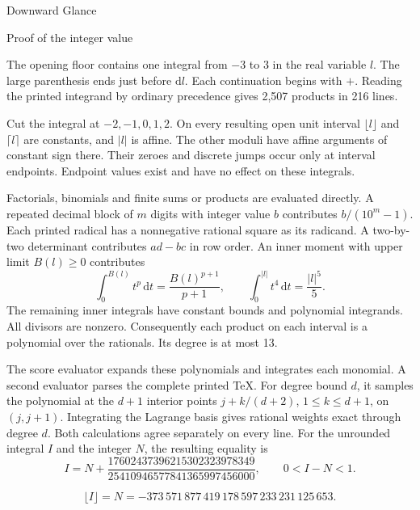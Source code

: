 \documentclass[10pt]{article}
\begin{document}
\fontsize{10.6}{14.0}\selectfont
{\fontsize{29}{32}\selectfont Downward Glance}\par
{\fontsize{15}{18}\selectfont Proof of the integer value}\par
\vspace{3pt}
The opening floor contains one integral from $-3$ to $3$ in the real variable $l$.
The large parenthesis ends just before $\mathrm{d}l$. Each continuation begins
with $+$. Reading the printed integrand by ordinary precedence gives 2,507
products in 216 lines.

\par
Cut the integral at $-2,-1,0,1,2$. On every resulting open unit interval
$\lfloor l\rfloor$ and $\lceil l\rceil$ are constants, and $|l|$ is affine.
The other moduli have affine arguments of constant sign there.
Their zeroes and discrete jumps occur only at interval endpoints.
Endpoint values exist and have no effect on these integrals.

Factorials, binomials and finite sums or products are evaluated directly.
A repeated decimal block of $m$ digits with integer value $b$ contributes
$b/(10^m-1)$. Each printed radical has a nonnegative rational square as its
radicand. A two-by-two determinant contributes $ad-bc$ in row order.
An inner moment with upper limit $B(l)\geq0$ contributes
\[
   \int_0^{B(l)} t^p\,\mathrm{d}t=\frac{B(l)^{p+1}}{p+1},\qquad \int_0^{|l|}t^4\,\mathrm{d}t=\frac{|l|^5}{5}.
\]
The remaining inner integrals have constant bounds and polynomial integrands.
All divisors are nonzero. Consequently each product on each interval is a
polynomial over the rationals. Its degree is at most 13.

\par
The score evaluator expands these polynomials and integrates each monomial.
A second evaluator parses the complete printed TeX. For degree bound $d$, it
samples the polynomial at the $d+1$ interior points
$j+k/(d+2)$, $1\leq k\leq d+1$, on $(j,j+1)$.
Integrating the Lagrange basis gives rational weights exact through degree $d$.
Both calculations agree separately on every line. For the unrounded integral
$I$ and the integer $N$, the resulting equality is
\[
 I=N+\frac{17602437396215302323978349}{25410946577841365997456000},\qquad 0<I-N<1 .
\]
\par
\[
   \lfloor I\rfloor=N=-373\,571\,877\,419\,178\,597\,233\,231\,125\,653 .
\]
\end{document}
